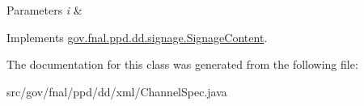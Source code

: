 \begin{DoxyParams}{Parameters}
{\em i} & \\
\hline
\end{DoxyParams}


Implements \hyperlink{interfacegov_1_1fnal_1_1ppd_1_1dd_1_1signage_1_1SignageContent_a59c75e24dcec3ea729297104328a7852}{gov.\-fnal.\-ppd.\-dd.\-signage.\-Signage\-Content}.



The documentation for this class was generated from the following file\-:\begin{DoxyCompactItemize}
\item 
src/gov/fnal/ppd/dd/xml/Channel\-Spec.\-java\end{DoxyCompactItemize}
